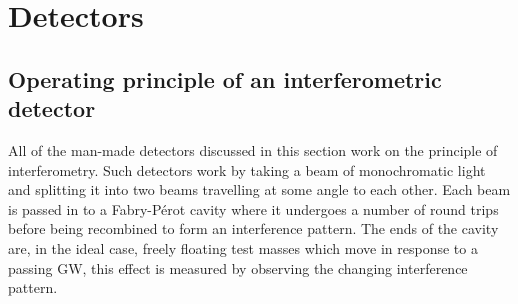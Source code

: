 \section{Detectors}\label{sec:detectors}

\subsection{Operating principle of an interferometric detector}\label{sec:principles}
All of the man-made detectors discussed in this section work on the principle of interferometry. Such detectors work by taking a beam of monochromatic light and splitting it into two beams travelling at some angle to each other. Each beam is passed in to a Fabry-P\'{e}rot cavity where it undergoes a number of round trips before being recombined to form an interference pattern. The ends of the cavity are, in the ideal case, freely floating test masses which move in response to a passing GW, this effect is measured by observing the changing interference pattern.

